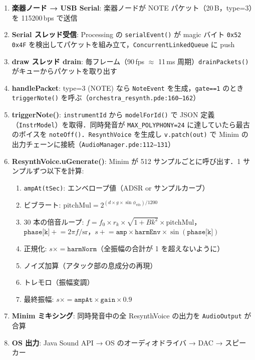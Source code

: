 \documentclass[uplatex,dvipdfmx,a4paper,10pt]{jsarticle}
\begin{document}
\begin{enumerate}
  \item \textbf{楽器ノード → USB Serial}: 楽器ノードが NOTE パケット（20\,B，type=3）を 115200\,bps で送信
  \item \textbf{Serial スレッド受信}: Processing の \texttt{serialEvent()} が magic バイト \texttt{0x52 0x4F} を検出してパケットを組み立て，\texttt{ConcurrentLinkedQueue} に push
  \item \textbf{draw スレッド drain}: 毎フレーム（90\,fps $\approx$ 11\,ms 周期）\texttt{drainPackets()} がキューからパケットを取り出す
  \item \textbf{handlePacket}: type=3 (NOTE) なら \texttt{NoteEvent} を生成，\texttt{gate==1} のとき \texttt{triggerNote()} を呼ぶ（\texttt{orchestra\_resynth.pde:160--162}）
  \item \textbf{triggerNote()}: \texttt{instrumentId} から \texttt{modelForId()} で JSON 定義（\texttt{InstrModel}）を取得．同時発音が \texttt{MAX\_POLYPHONY=24} に達していたら最古のボイスを \texttt{noteOff()}．\texttt{ResynthVoice} を生成し \texttt{v.patch(out)} で Minim の出力チェーンに接続（\texttt{AudioManager.pde:112--131}）
  \item \textbf{ResynthVoice.uGenerate()}: Minim が 512 サンプルごとに呼び出す．1 サンプルずつ以下を計算:
    \begin{enumerate}[label=(\alph*)]
      \item \texttt{ampAt(tSec)}: エンベロープ値（ADSR or サンプルカーブ）
      \item ビブラート: $\text{pitchMul} = 2^{(d \times g \times \sin\phi_\text{vib})/1200}$
      \item 30 本の倍音ループ: $f = f_0 \times r_k \times \sqrt{1+Bk^2} \times \text{pitchMul}$，$\texttt{phase[k]} \mathrel{+}= 2\pi f / \text{sr}$，$s \mathrel{+}= \texttt{amp} \times \texttt{harmEnv} \times \sin(\texttt{phase[k]})$
      \item 正規化: $s \times= \texttt{harmNorm}$（全振幅の合計が 1 を超えないように）
      \item ノイズ加算（アタック部の息成分の再現）
      \item トレモロ（振幅変調）
      \item 最終振幅: $s \times= \texttt{ampAt} \times \texttt{gain} \times 0.9$
    \end{enumerate}
  \item \textbf{Minim ミキシング}: 同時発音中の全 ResynthVoice の出力を \texttt{AudioOutput} が合算
  \item \textbf{OS 出力}: Java Sound API → OS のオーディオドライバ → DAC → スピーカー
\end{enumerate}
\end{document}
